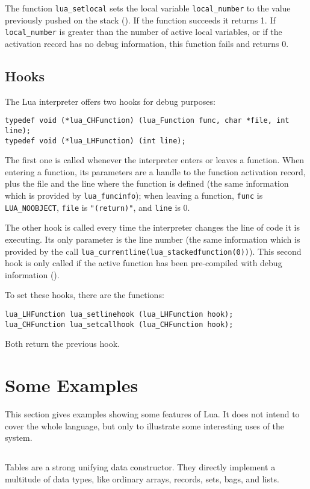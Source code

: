 The function \verb'lua_setlocal' sets the local variable
\verb'local_number' to the value previously pushed on the stack
().
If the function succeeds it returns 1.
If \verb'local_number' is greater than the number
of active local variables,
or if the activation record has no debug information,
this function fails and returns 0.

\subsection{Hooks}

The Lua interpreter offers two hooks for debug purposes:
\begin{verbatim}
typedef void (*lua_CHFunction) (lua_Function func, char *file, int line);
typedef void (*lua_LHFunction) (int line);
\end{verbatim}
The first one is called whenever the interpreter enters or leaves a
function.
When entering a function,
its parameters are a handle to the function activation record,
plus the file and the line where the function is defined (the same
information which is provided by \verb'lua_funcinfo');
when leaving a function, \verb'func' is \verb'LUA_NOOBJECT',
\verb'file' is \verb'"(return)"', and \verb'line' is 0.

The other hook is called every time the interpreter changes
the line of code it is executing.
Its only parameter is the line number
(the same information which is provided by the call
\verb'lua_currentline(lua_stackedfunction(0))').
This second hook is only called if the active function
has been pre-compiled with debug information ().

To set these hooks, there are the functions:
\begin{verbatim}
lua_LHFunction lua_setlinehook (lua_LHFunction hook);
lua_CHFunction lua_setcallhook (lua_CHFunction hook);
\end{verbatim}
Both return the previous hook.


\section{Some Examples}

This section gives examples showing some features of Lua.
It does not intend to cover the whole language,
but only to illustrate some interesting uses of the system.


\subsection{}
Tables are a strong unifying data constructor.
They directly implement a multitude of data types,
like ordinary arrays, records, sets, bags, and lists.

